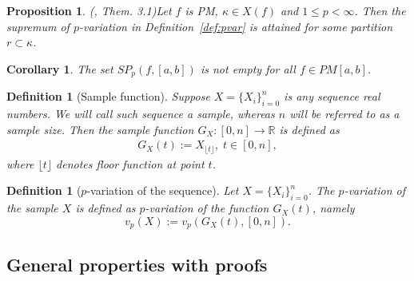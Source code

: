\documentclass[12pt, a4paper]{article}
\newtheorem{proposition}[theorem]{Proposition}
\newtheorem{definition}[theorem]{Definition}
\newtheorem{corollary}[theorem]{Corollary}
\numberwithin{equation}{section}
\begin{document}
\begin{proposition}(\cite{Qian}, Them. 3.1)\label{prop:sup_in_PM}
  Let $f$ is PM, $\kappa \in X(f)$ and $1 \leq p < \infty$. 
  Then the supremum of $p$-variation in Definition~\ref{def:pvar}
  is attained for some partition $r \subset  \kappa$.
\end{proposition} 
\begin{corollary}\label{cor:SPNotEmpty}
  The set $SP_{p}(f,[a,b])$ is not empty for all $f \in PM[a,b]$.  
\end{corollary}


\begin{definition}[Sample function]\label{def:Seq2Fun}
  Suppose $X=\{X_{i}\}_{i=0}^{n}$ is 
  any sequence real numbers. 
  We will call such sequence a \emph{sample}, 
  whereas $n$ will be referred to as a 
  \emph{sample size}.
  Then the \emph{sample function}  
  $G_X:[0,n] \rightarrow \mathbb{R}$ is defined as 
  \begin{eqnarray}
    G_X(t) := X_{\lfloor t \rfloor},\;t\in[0,n],
  \end{eqnarray}
  where $\lfloor t \rfloor$ denotes floor 
  function at point $t$. 
\end{definition} 

\begin{definition}[$p$-variation of the sequence]\label{def:pvarseq}
  Let $X=\{X_i\}_{i=0}^n$. The $p$-variation
  of the sample $X$ is defined as $p$-variation of the 
  function $G_X(t)$, namely
  \begin{equation}
    v_p(X) := v_p(G_X(t),[0,n]).
  \end{equation}
\end{definition}


\subsection{General properties with proofs}
\end{document}
